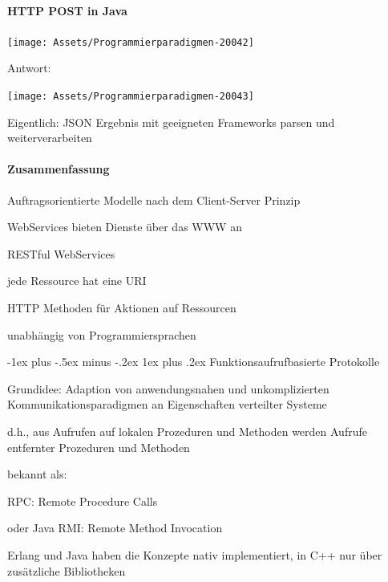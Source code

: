 \documentclass[10pt]{article}
\makeatletter
\renewcommand{\subsubsection}{\@startsection{subsubsection}{3}{0mm}%
                                {-1ex plus -.5ex minus -.2ex}%
                                {1ex plus .2ex}%
                                {\normalfont\small\bfseries}}
\makeatother
\begin{document}
  \paragraph{HTTP POST in Java}
  
  \begin{center}
    \centering
    \texttt{[image: Assets/Programmierparadigmen-20042]}
  \end{center}
  Antwort: 
  \begin{center}
    \centering
    \texttt{[image: Assets/Programmierparadigmen-20043]}
  \end{center}
  Eigentlich: JSON Ergebnis mit geeigneten Frameworks parsen und weiterverarbeiten
  
  \paragraph{Zusammenfassung}
  
  \begin{itemize*}
    \item Auftragsorientierte Modelle nach dem Client-Server Prinzip
    \item WebServices bieten Dienste über das WWW an
    \item RESTful WebServices
    \begin{itemize*}
      \item jede Ressource hat eine URI
      \item HTTP Methoden für Aktionen auf Ressourcen
      \item unabhängig von Programmiersprachen
    \end{itemize*}
  \end{itemize*}
  
  \subsubsection{Funktionsaufrufbasierte Protokolle}
  \begin{itemize*}
    \item Grundidee: Adaption von anwendungsnahen und unkomplizierten Kommunikationsparadigmen an Eigenschaften verteilter Systeme
    \item d.h., aus Aufrufen auf lokalen Prozeduren und Methoden werden Aufrufe entfernter Prozeduren und Methoden
    \item bekannt als:
    \begin{itemize*}
      \item RPC: Remote Procedure Calls
      \item oder Java RMI: Remote Method Invocation
    \end{itemize*}
    \item Erlang und Java haben die Konzepte nativ implementiert, in C++ nur über zusätzliche Bibliotheken
  \end{itemize*}
  
\end{document}
